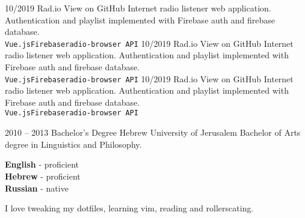 \documentclass[9pt]{developercv} %
\begin{document}
\begin{entrylist}
  \entry
    {10/2019}
    {Rad.io}
    {View on GitHub}
		{Internet radio listener web application. Authentication and playlist implemented with Firebase auth and firebase database. \\ \texttt{Vue.js}\slashsep\texttt{Firebase}\slashsep\texttt{radio-browser API}}
 \entry
    {10/2019}
    {Rad.io}
    {View on GitHub}
		{Internet radio listener web application. Authentication and playlist implemented with Firebase auth and firebase database. \\ \texttt{Vue.js}\slashsep\texttt{Firebase}\slashsep\texttt{radio-browser API}}
  \entry
    {10/2019}
    {Rad.io}
    {View on GitHub}
		{Internet radio listener web application. Authentication and playlist implemented with Firebase auth and firebase database. \\ \texttt{Vue.js}\slashsep\texttt{Firebase}\slashsep\texttt{radio-browser API}}

\end{entrylist}


\begin{entrylist}
  \entry
      {2010 -- 2013}
      {Bachelor's Degree}
      {Hebrew University of Jerusalem}
      {Bachelor of Arts degree in Linguistics and Philosophy.}
\end{entrylist}


\begin{minipage}[t]{0.5\textwidth}
	\vspace{-\baselineskip} %

	
	\textbf{English} - proficient\\
	\textbf{Hebrew} - proficient\\
	\textbf{Russian} - native\\
\end{minipage}
\hfill
\begin{minipage}[t]{0.5\textwidth}
	\vspace{-\baselineskip} %
	
	
  I love tweaking my dotfiles, learning vim, reading and rollerscating.
	\end{minipage}
\hfill

\end{document}
